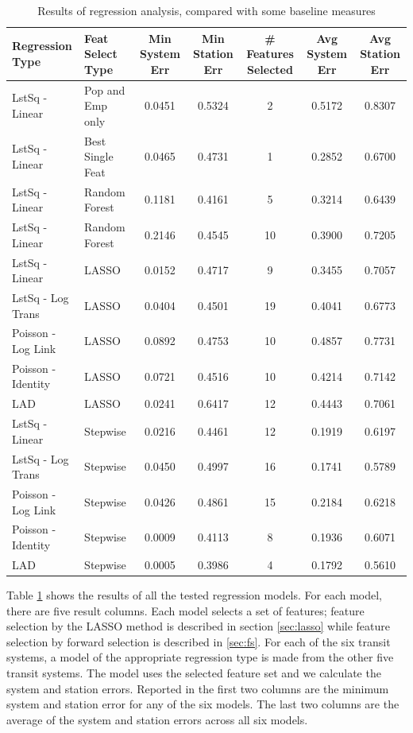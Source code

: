 \documentclass[11pt]{report}
\begin{document}
\begin{table}[H]
\begingroup\fontsize{8}{15}\selectfont
\centering
\begin{tabular}{ll|ccccc}
\toprule
Regression Type&Feat Select Type& Min System Err&Min Station Err& \# Features Selected& Avg System Err& Avg Station Err\\
\midrule
LstSq - Linear&Pop and Emp only&0.0451&0.5324&2&0.5172&0.8307\\
LstSq - Linear&Best Single Feat&0.0465&0.4731&1&0.2852&0.6700\\
LstSq - Linear&Random Forest&0.1181&0.4161&5&0.3214&0.6439\\
LstSq - Linear&Random Forest&0.2146&0.4545&10&0.3900&0.7205\\
\midrule
LstSq - Linear&LASSO&0.0152&0.4717&9&0.3455&0.7057\\
LstSq - Log Trans&LASSO&0.0404&0.4501&19&0.4041&0.6773\\
Poisson - Log Link&LASSO&0.0892&0.4753&10&0.4857&0.7731\\
Poisson - Identity&LASSO&0.0721&0.4516&10&0.4214&0.7142\\
LAD&LASSO&0.0241&0.6417&12&0.4443&0.7061\\
\midrule
LstSq - Linear&Stepwise&0.0216&0.4461&12&0.1919&0.6197\\
LstSq - Log Trans&Stepwise&0.0450&0.4997&16&0.1741&0.5789\\
Poisson - Log Link&Stepwise&0.0426&0.4861&15&0.2184&0.6218\\
Poisson - Identity&Stepwise&0.0009&0.4113&8&0.1936&0.6071\\
LAD&Stepwise&0.0005&0.3986&4&0.1792&0.5610\\
\end{tabular}
\caption{Results of regression analysis, compared with some baseline measures}\label{tab:rresults}
\endgroup
\end{table}



Table \ref{tab:rresults} shows the results of all the tested regression models. For each model, there are five result columns. Each model selects a set of features; feature selection by the LASSO method is described in section \ref{sec:lasso} while feature selection by forward selection is described in \ref{sec:fs}. For each of the six transit systems, a model of the appropriate regression type is made from the other five transit systems. The model uses the selected feature set and we calculate the system and station errors. Reported in the first two columns are the minimum system and station error for any of the six models. The last two columns are the average of the system and station errors across all six models. 
\end{document}
